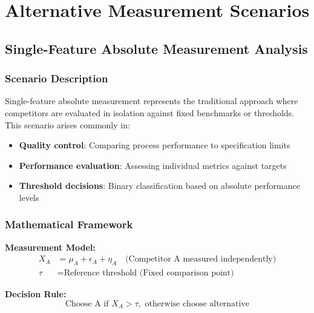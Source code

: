 
\section{Alternative Measurement Scenarios}
\label{app:scenarios}

\subsection{Single-Feature Absolute Measurement Analysis}

\subsubsection{Scenario Description}

Single-feature absolute measurement represents the traditional approach where competitors are evaluated in isolation against fixed benchmarks or thresholds. This scenario arises commonly in:

\begin{itemize}
\item \textbf{Quality control}: Comparing process performance to specification limits
\item \textbf{Performance evaluation}: Assessing individual metrics against targets
\item \textbf{Threshold decisions}: Binary classification based on absolute performance levels
\end{itemize}

\subsubsection{Mathematical Framework}

\textbf{Measurement Model:}
\begin{align}
X_A &= \mu_A + \epsilon_A + \eta_A \quad \text{(Competitor A measured independently)} \\
\tau &= \text{Reference threshold (Fixed comparison point)}
\end{align}

\textbf{Decision Rule:}
\begin{equation}
\text{Choose A if } X_A > \tau, \text{ otherwise choose alternative}
\end{equation}

